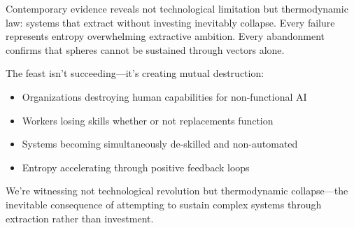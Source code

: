 Contemporary evidence reveals not technological limitation but thermodynamic law: systems that extract without investing inevitably collapse. Every failure represents entropy overwhelming extractive ambition. Every abandonment confirms that spheres cannot be sustained through vectors alone.

The feast isn't succeeding---it's creating mutual destruction:
\begin{itemize}
\item Organizations destroying human capabilities for non-functional AI
\item Workers losing skills whether or not replacements function
\item Systems becoming simultaneously de-skilled and non-automated
\item Entropy accelerating through positive feedback loops
\end{itemize}

We're witnessing not technological revolution but thermodynamic collapse---the inevitable consequence of attempting to sustain complex systems through extraction rather than investment.
